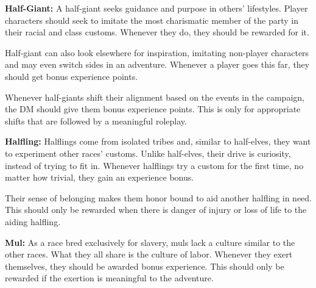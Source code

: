 
\textbf{Half-Giant:} A half-giant seeks guidance and purpose in others' lifestyles. Player characters should seek to imitate the most charismatic member of the party in their racial and class customs. Whenever they do, they should be rewarded for it.

Half-giant can also look elsewhere for inspiration, imitating non-player characters and may even switch sides in an adventure. Whenever a player goes this far, they should get bonus experience points.

Whenever half-giants shift their alignment based on the events in the campaign, the DM should give them bonus experience points. This is only for appropriate shifts that are followed by a meaningful roleplay.


\textbf{Halfling:} Halflings come from isolated tribes and, similar to half-elves, they want to experiment other races' customs. Unlike half-elves, their drive is curiosity, instead of trying to fit in. Whenever halflings try a  custom for the first time, no matter how trivial, they gain an experience bonus.

Their sense of belonging makes them honor bound to aid another halfling in need. This should only be rewarded when there is danger of injury or loss of life to the aiding halfling.


\textbf{Mul:} As a race bred exclusively for slavery, muls lack a culture similar to the other races. What they all share is the culture of labor. Whenever they exert themselves, they should be awarded bonus experience. This should only be rewarded if the exertion is meaningful to the adventure.


